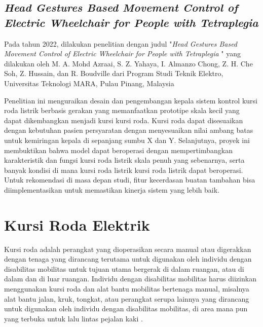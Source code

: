 \subsection{\textit{Head Gestures Based Movement Control of Electric Wheelchair for People with Tetraplegia }}

Pada tahun 2022, dilakukan penelitian dengan judul "\textit{Head Gestures Based Movement Control of Electric Wheelchair for People with Tetraplegia }" yang dilakukan oleh M. A. Mohd Azraai, S. Z. Yahaya, I. Almanzo Chong, Z. H. Che Soh, Z. Hussain, dan R. Boudville dari Program Studi Teknik Elektro, Universitas Teknologi MARA, Pulau Pinang, Malaysia \parencite{9935646}

Penelitian ini menguraikan desain dan pengembangan kepala sistem kontrol kursi roda listrik berbasis gerakan yang memanfaatkan prototipe skala kecil yang dapat dikembangkan menjadi kursi 
kursi roda. Kursi roda dapat disesuaikan dengan kebutuhan pasien persyaratan dengan menyesuaikan nilai ambang batas untuk kemiringan kepala di sepanjang sumbu X dan Y. Selanjutnya, proyek ini membuktikan bahwa model dapat beroperasi dengan mempertimbangkan karakteristik dan fungsi kursi roda listrik skala penuh yang sebenarnya, serta banyak kondisi di mana kursi roda listrik kursi roda listrik dapat beroperasi. Untuk rekomendasi di masa depan studi, fitur kecerdasan buatan tambahan bisa diimplementasikan untuk memastikan kinerja sistem yang lebih baik.

\section{Kursi Roda Elektrik}
\label{subsec:kursirodaelektrik}

Kursi roda adalah perangkat yang dioperasikan secara manual atau digerakkan dengan tenaga yang dirancang terutama untuk digunakan oleh individu dengan disabilitas mobilitas untuk tujuan utama bergerak di dalam ruangan, atau di dalam dan di luar ruangan.  Individu dengan disabilitas mobilitas harus diizinkan menggunakan kursi roda dan alat bantu mobilitas bertenaga manual, misalnya alat bantu jalan, kruk, tongkat, atau perangkat serupa lainnya yang dirancang untuk digunakan oleh individu dengan disabilitas mobilitas, di area mana pun yang terbuka untuk lalu lintas pejalan kaki \parencite{ADA_2023}.

